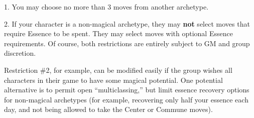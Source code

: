 \documentclass[oneside,10pt]{article}
\begin{document}
\begin{multicols}{2}
\begin{adjustwidth*}{.5cm}{.5cm}
1. You may choose no more than 3 moves from another
archetype.

2. If your character is a non-magical archetype, they may
\textbf{not} select moves that require Essence to be spent. They
may select moves with optional Essence requirements.
Of course, both restrictions are entirely subject to GM and
group discretion.
\end{adjustwidth*}

Restriction \#2, for example, can be modified easily if the group
wishes all characters in their game to have some magical potential. One potential alternative is to permit open “multiclassing,” but limit essence recovery options for non-magical
archetypes (for example, recovering only half your essence
each day, and not being allowed to take the Center or Commune moves).


\end{multicols}

\end{document}
